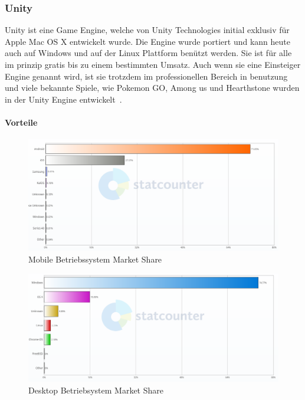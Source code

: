 \subsubsection{Unity}

Unity ist eine Game Engine, welche von Unity Technologies initial exklusiv für Apple Mac OS X entwickelt wurde.
Die Engine wurde portiert und kann heute auch auf Windows und auf der Linux Plattform benützt werden.
Sie ist für alle im prinzip gratis bis zu einem bestimmten Umsatz.
Auch wenn sie eine Einsteiger Engine genannt wird, ist sie trotzdem im professionellen Bereich in benutzung und viele bekannte Spiele, wie Pokemon GO, Among us und Hearthstone wurden in der Unity Engine entwickelt~\cite{Haas2014AHO,Unity_System_Specification,UNITY_PRICING_1,WIKIPEDIA_UNITY_GAME_LIST_2014}.

\paragraph{Vorteile}

\begin{figure}
    \centering
    \includegraphics[scale=0.35]{pics/mobile_os_marketshare}
    \caption{Mobile Betriebssystem Market Share~\cite{StatCounter_Mobile_2021}}
    \label{fig:mobile-os-market-share}
\end{figure}

\begin{figure}
    \centering
    \includegraphics[scale=0.35]{pics/desktop_os_market_share}
    \caption{Desktop Betriebsystem Market Share~\cite{StatCounter_Desktop_2021}}
    \label{fig:desktop-os-market-share}
\end{figure}



